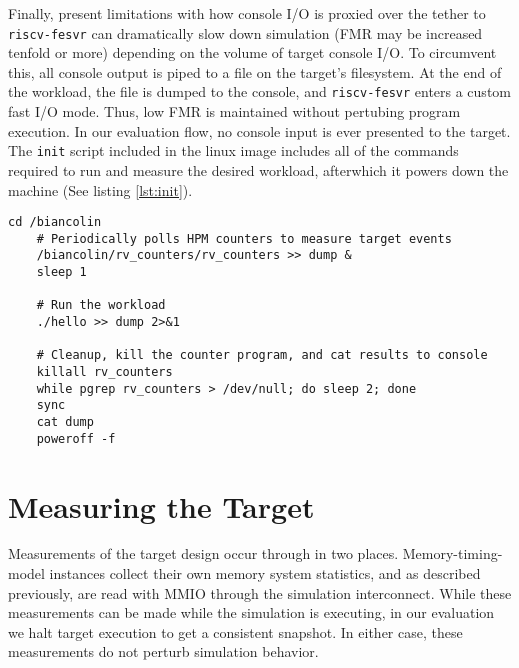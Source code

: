 Finally, present limitations with how console I/O is proxied over the tether to
\texttt{riscv-fesvr} can dramatically slow down simulation (FMR may be increased
tenfold or more) depending on the volume of target console I/O. To circumvent
this, all console output is piped to a file on the target's filesystem. At the
end of the workload, the file is dumped to the console, and \texttt{riscv-fesvr}
enters a custom fast I/O mode. Thus, low FMR is maintained without pertubing
program execution. In our evaluation flow, no console input is ever presented
to the target. The \texttt{init} script included in the linux image includes
all of the commands required to run and measure the desired workload,
afterwhich it powers down the machine (See listing \ref{lst:init}).\\


\lstset{style=init}

\begin{lstlisting}[caption={An example init script generated during the build process},label={lst:init}]
    cd /biancolin
    # Periodically polls HPM counters to measure target events
    /biancolin/rv_counters/rv_counters >> dump &
    sleep 1

    # Run the workload
    ./hello >> dump 2>&1

    # Cleanup, kill the counter program, and cat results to console
    killall rv_counters
    while pgrep rv_counters > /dev/null; do sleep 2; done
    sync
    cat dump
    poweroff -f
\end{lstlisting}

\section{Measuring the Target}

Measurements of the target design occur through in two places.
Memory-timing-model instances collect their own memory system statistics, and
as described previously, are read with MMIO through the simulation
interconnect. While these measurements can be made while the simulation is
executing, in our evaluation we halt target execution to get a consistent
snapshot. In either case, these measurements do not perturb simulation
behavior.


